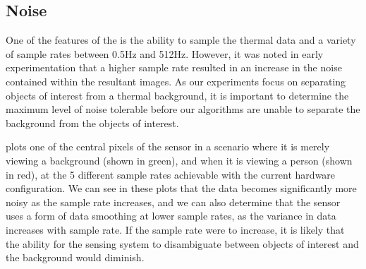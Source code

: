 \documentclass[../thesis/thesis.tex]{subfiles}
\begin{document}
\subsection{Noise}

One of the features of the \mlx is the ability to sample the thermal data and a variety of sample rates between 0.5Hz and 512Hz. However, it was noted in early experimentation that a higher sample rate resulted in an increase in the noise contained within the resultant images. As our experiments focus on separating objects of interest from a thermal background, it is important to determine the maximum level of noise tolerable before our algorithms are unable to separate the background from the objects of interest.

 plots one of the central pixels of the sensor in a scenario where it is merely viewing a background (shown in green), and when it is viewing a person (shown in red), at the 5 different sample rates achievable with the current hardware configuration. We can see in these plots that the data becomes significantly more noisy as the sample rate increases, and we can also determine that the sensor uses a form of data smoothing at lower sample rates, as the variance in data increases with sample rate. If the sample rate were to increase, it is likely that the ability for the sensing system to disambiguate between objects of interest and the background would diminish.
\end{document}
